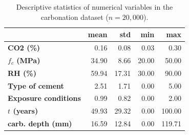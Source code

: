 \begin{table}[htpb!]
    \centering
    \small
    \caption{Descriptive statistics of numerical variables in the carbonation dataset ($n = 20,000$).}
    \label{tab:statistics}
     \begin{tabular}{lrrrr}
    \toprule
     & \textbf{mean} & \textbf{std} & \textbf{min} & \textbf{max} \\
    \midrule
   \textbf{ CO2 (\%)} & 0.16 & 0.08 & 0.03 & 0.30 \\
   \textbf{ $f_c$ (MPa)} & 34.90 & 8.66 & 20.00 & 50.00 \\
    \textbf{RH (\%)} & 59.94 & 17.31 & 30.00 & 90.00 \\
    \textbf{Type of cement} & 2.51 & 1.71 & 0.00 & 5.00 \\
    \textbf{Exposure conditions} & 0.99 & 0.82 & 0.00 & 2.00 \\
    \textbf{$t$ (years)} & 49.93 & 29.32 & 0.00 & 100.00 \\
    \textbf{carb. depth (mm)} & 16.59 & 12.84 & 0.00 & 119.71 \\
    \bottomrule
    \end{tabular}
\end{table}

